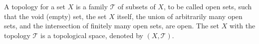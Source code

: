 A topology for a set $X$ is a family $\mathcal{T}$ of subsets of $X$, to be called open sets, such that the void (empty) set, the set $X$ itself, the union of arbitrarily many open sets, and the intersection of finitely many open sets, are open. The set $X$ with the topology $\mathcal{T}$ is a topological space, denoted by $(X, \mathcal{T})$.
